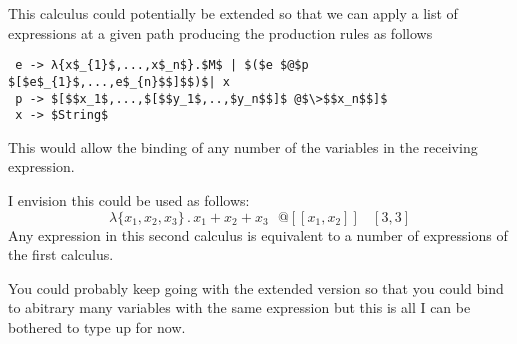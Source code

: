 \documentclass{article}
\begin{document}
\noindent This calculus could potentially be extended so that we can apply a list of expressions at a given path producing the production rules as follows
\begin{lstlisting}
 e -> λ{x$_{1}$,...,x$_n$}.$M$ | $($e $@$p $[$e$_{1}$,...,e$_{n}$$]$$)$| x
 p -> $[$$x_1$,...,$[$$y_1$,..,$y_n$$]$ @$\>$$x_n$$]$
 x -> $String$
\end{lstlisting}
\vspace{-5mm}
\noindent This would allow the binding of any number of the variables in the receiving expression. 

\noindent I envision this could be used as follows:
\begin{equation}
    \lambda\{x_1,x_2,x_3\}\,.\,x_1 + x_2 + x_3 \>\>\>@[[x_1, x_2]]\>\>\>\>[3,3]
\end{equation}
\noindent Any expression in this second calculus is equivalent to a number of expressions of the first calculus.

\noindent You could probably keep going with the extended version so that you could bind to abitrary many variables with the same expression but this is all I can be bothered to type up for now.
\end{document}
